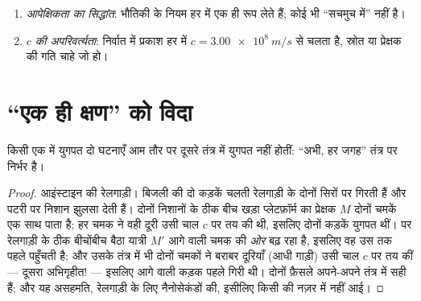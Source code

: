 \begin{theorem}[विशिष्ट आपेक्षिकता के अभिगृहीत]\label{thm:g12:special-relativity:postulates}
\begin{enumerate}
  \item \emph{आपेक्षिकता का सिद्धांत}: भौतिकी के नियम हर  में एक ही रूप लेते हैं; कोई भी ``सचमुच  में'' नहीं है।
  \item \emph{$c$ की अपरिवर्त्यता}: निर्वात में प्रकाश हर  में $c = \qty{3.00e8}{m/s}$ से चलता है, स्रोत या प्रेक्षक की गति चाहे जो हो।
\end{enumerate}
\end{theorem}
\admitted

\section{``एक ही क्षण'' को विदा}

\begin{proposition}[युगपतता की आपेक्षिकता]\label{prop:g12:special-relativity:simultaneity}
किसी एक  में युगपत दो घटनाएँ आम तौर पर दूसरे तंत्र
में युगपत नहीं होतीं: ``अभी, हर जगह'' तंत्र पर निर्भर है।
\end{proposition}

\begin{proof}
आइंस्टाइन की रेलगाड़ी। बिजली की दो कड़कें चलती रेलगाड़ी के दोनों सिरों पर गिरती
हैं और पटरी पर निशान झुलसा देती हैं। दोनों निशानों के ठीक बीच खड़ा प्लेटफ़ॉर्म का
प्रेक्षक $M$ दोनों चमकें एक साथ पाता है; हर चमक ने वही दूरी उसी चाल $c$
पर तय की थी, इसलिए दोनों कड़कें युगपत थीं। पर रेलगाड़ी के ठीक बीचोंबीच बैठा
यात्री $M'$ आगे वाली चमक की \emph{ओर} बढ़ रहा है, इसलिए वह उस तक पहले पहुँचती
है; और उसके तंत्र में भी दोनों चमकों ने बराबर दूरियाँ (आधी गाड़ी) उसी चाल $c$
पर तय कीं --- दूसरा अभिगृहीत! --- इसलिए आगे वाली कड़क पहले गिरी थी। दोनों फ़ैसले
अपने-अपने तंत्र में सही हैं; और यह असहमति, रेलगाड़ी के लिए नैनोसेकंडों की, इसीलिए
किसी की नज़र में नहीं आई।
\end{proof}

